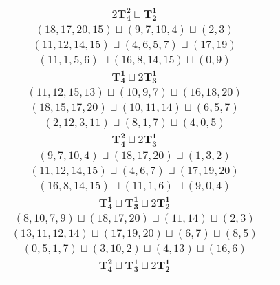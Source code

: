 \documentclass{article}
\begin{document}
\begin{longtable}{|c|c|}
        \hline
        $2\mathbf{T_{4}^{2}} \sqcup \mathbf{T_{2}^{1}}$ & \begin{tabular}{c}
        $(18,15,13,14)\sqcup(11,9,12,6)\sqcup(1,2)$ \\ 
        $(18,17,20,15)\sqcup(9,7,10,4)\sqcup(2,3)$ \\ 
        $(11,12,14,15)\sqcup(4,6,5,7)\sqcup(17,19)$ \\ 
        $(11,1,5,6)\sqcup(16,8,14,15)\sqcup(0,9)$
        \end{tabular} \\ 
        \hline
        $\mathbf{T_{4}^{1}} \sqcup 2\mathbf{T_{3}^{1}}$ & \begin{tabular}{c}
        $(16,15,14,13)\sqcup(0,3,5)\sqcup(12,9,6)$ \\ 
        $(11,12,15,13)\sqcup(10,9,7)\sqcup(16,18,20)$ \\ 
        $(18,15,17,20)\sqcup(10,11,14)\sqcup(6,5,7)$ \\ 
        $(2,12,3,11)\sqcup(8,1,7)\sqcup(4,0,5)$
        \end{tabular} \\ 
        \hline
        $\mathbf{T_{4}^{2}} \sqcup 2\mathbf{T_{3}^{1}}$ & \begin{tabular}{c}
        $(11,9,12,6)\sqcup(18,15,13)\sqcup(0,1,2)$ \\ 
        $(9,7,10,4)\sqcup(18,17,20)\sqcup(1,3,2)$ \\ 
        $(11,12,14,15)\sqcup(4,6,7)\sqcup(17,19,20)$ \\ 
        $(16,8,14,15)\sqcup(11,1,6)\sqcup(9,0,4)$
        \end{tabular} \\ 
        \hline
        $\mathbf{T_{4}^{1}} \sqcup \mathbf{T_{3}^{1}} \sqcup 2\mathbf{T_{2}^{1}}$ & \begin{tabular}{c}
        $(8,6,9,11)\sqcup(0,1,2)\sqcup(16,19)\sqcup(18,15)$ \\ 
        $(8,10,7,9)\sqcup(18,17,20)\sqcup(11,14)\sqcup(2,3)$ \\ 
        $(13,11,12,14)\sqcup(17,19,20)\sqcup(6,7)\sqcup(8,5)$ \\ 
        $(0,5,1,7)\sqcup(3,10,2)\sqcup(4,13)\sqcup(16,6)$
        \end{tabular} \\ 
        \hline
        $\mathbf{T_{4}^{2}} \sqcup \mathbf{T_{3}^{1}} \sqcup 2\mathbf{T_{2}^{1}}$ & \begin{tabular}{c}
        $(11,9,12,6)\sqcup(0,1,2)\sqcup(18,15)\sqcup(13,14)$ \\ 

\end{tabular}
\end{longtable}
\end{document}
